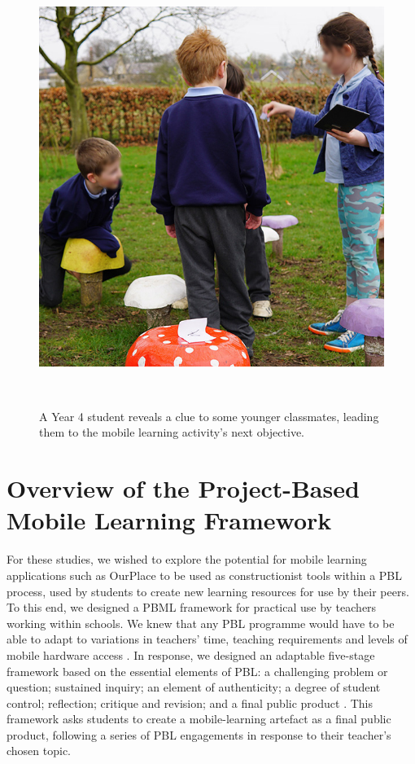 \begin{figure}
\centering
  \includegraphics[width=0.66\columnwidth]{images/chapter08/mushrooms.jpg}
  \caption[Year 4 students using OurPlace]{A Year 4 student reveals a clue to some younger classmates, leading them to the mobile learning activity's next objective. }~\label{fig:Mushrooms}
  \vspace{-2.3em}
\end{figure}

\section{Overview of the Project-Based Mobile Learning Framework}
For these studies, we wished to explore the potential for mobile learning applications such as OurPlace to be used as constructionist tools within a PBL process, used by students to create new learning resources for use by their peers. To this end, we designed a PBML framework for practical use by teachers working within schools. We knew that any PBL programme would have to be able to adapt to variations in teachers' time, teaching requirements and levels of mobile hardware access \citep{Blumenfeld1991, Krajcik2006, InnovationUnit2016, TheEducationEndowmentFoundation2016}. In response, we designed an adaptable five-stage framework based on the essential elements of PBL: a challenging problem or question; sustained inquiry; an element of authenticity; a degree of student control; reflection; critique and revision; and a final public product \citep{Larmer2015}. This framework asks students to create a mobile-learning artefact as a final public product, following a series of PBL engagements in response to their teacher's chosen topic. 

